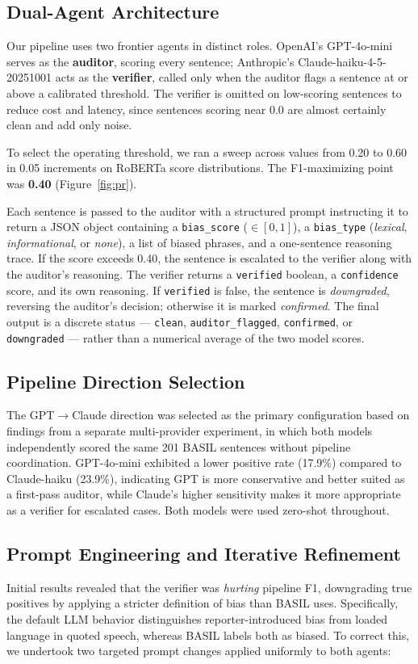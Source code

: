 \documentclass[11pt]{article}
\begin{document}
\subsection{Dual-Agent Architecture}
Our pipeline uses two frontier agents in distinct roles. OpenAI's GPT-4o-mini serves as the \textbf{auditor}, scoring every sentence; Anthropic's Claude-haiku-4-5-20251001 acts as the \textbf{verifier}, called only when the auditor flags a sentence at or above a calibrated threshold. The verifier is omitted on low-scoring sentences to reduce cost and latency, since sentences scoring near 0.0 are almost certainly clean and add only noise.

To select the operating threshold, we ran a sweep across values from 0.20 to 0.60 in 0.05 increments on RoBERTa score distributions. The F1-maximizing point was \textbf{0.40} (Figure~\ref{fig:pr}).

Each sentence is passed to the auditor with a structured prompt instructing it to return a JSON object containing a \texttt{bias\_score} ($\in[0,1]$), a \texttt{bias\_type} (\textit{lexical}, \textit{informational}, or \textit{none}), a list of biased phrases, and a one-sentence reasoning trace. If the score exceeds 0.40, the sentence is escalated to the verifier along with the auditor's reasoning. The verifier returns a \texttt{verified} boolean, a \texttt{confidence} score, and its own reasoning. If \texttt{verified} is false, the sentence is \textit{downgraded}, reversing the auditor's decision; otherwise it is marked \textit{confirmed}. The final output is a discrete status --- \texttt{clean}, \texttt{auditor\_flagged}, \texttt{confirmed}, or \texttt{downgraded} --- rather than a numerical average of the two model scores.

\subsection{Pipeline Direction Selection}
The GPT$\rightarrow$Claude direction was selected as the primary configuration based on findings from a separate multi-provider experiment, in which both models independently scored the same 201 BASIL sentences without pipeline coordination. GPT-4o-mini exhibited a lower positive rate (17.9\%) compared to Claude-haiku (23.9\%), indicating GPT is more conservative and better suited as a first-pass auditor, while Claude's higher sensitivity makes it more appropriate as a verifier for escalated cases. Both models were used zero-shot throughout.

\subsection{Prompt Engineering and Iterative Refinement}
Initial results revealed that the verifier was \textit{hurting} pipeline F1, downgrading true positives by applying a stricter definition of bias than BASIL uses. Specifically, the default LLM behavior distinguishes reporter-introduced bias from loaded language in quoted speech, whereas BASIL labels both as biased. To correct this, we undertook two targeted prompt changes applied uniformly to both agents:
\end{document}
